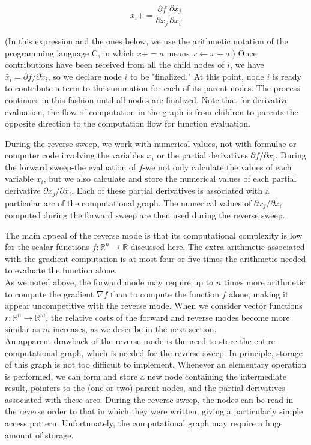 $$
\bar{x}_{i}+=\frac{\partial f}{\partial x_{j}} \frac{\partial x_{j}}{\partial x_{i}}
$$

(In this expression and the ones below, we use the arithmetic notation of the programming language $\mathrm{C}$, in which $x+=a$ means $x \leftarrow x+a$.) Once contributions have been received from all the child nodes of $i$, we have $\bar{x}_{i}=\partial f / \partial x_{i}$, so we declare node $i$ to be "finalized." At this point, node $i$ is ready to contribute a term to the summation for each of its parent nodes. The process continues in this fashion until all nodes are finalized. Note that for derivative evaluation, the flow of computation in the graph is from children to parents-the opposite direction to the computation flow for function evaluation.

During the reverse sweep, we work with numerical values, not with formulae or computer code involving the variables $x_{i}$ or the partial derivatives $\partial f / \partial x_{i}$. During the forward sweep-the evaluation of $f$-we not only calculate the values of each variable $x_{i}$, but we also calculate and store the numerical values of each partial derivative $\partial x_{j} / \partial x_{i}$. Each of these partial derivatives is associated with a particular arc of the computational graph. The numerical values of $\partial x_{j} / \partial x_{i}$ computed during the forward sweep are then used during the reverse sweep.




The main appeal of the reverse mode is that its computational complexity is low for the scalar functions $f: \mathbb{R}^{n} \rightarrow \mathbb{R}$ discussed here. The extra arithmetic associated with the gradient computation is at most four or five times the arithmetic needed to evaluate the function alone. \\
As we noted above, the forward mode may require up to $n$ times more arithmetic to compute the gradient $\nabla f$ than to compute the function $f$ alone, making it appear uncompetitive with the reverse mode. When we consider vector functions $r: \mathbb{R}^{n} \rightarrow \mathbb{R}^{m}$, the relative costs of the forward and reverse modes become more similar as $m$ increases, as we describe in the next section.\\
An apparent drawback of the reverse mode is the need to store the entire computational graph, which is needed for the reverse sweep. In principle, storage of this graph is not too difficult to implement. Whenever an elementary operation is performed, we can form and store a new node containing the intermediate result, pointers to the (one or two) parent nodes, and the partial derivatives associated with these arcs. During the reverse sweep, the nodes can be read in the reverse order to that in which they were written, giving a particularly simple access pattern. 
Unfortunately, the computational graph may require a huge amount of storage.



